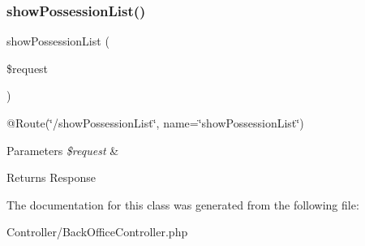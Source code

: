 \subsubsection{\texorpdfstring{showPossessionList()}{showPossessionList()}}
{\footnotesize\ttfamily show\+Possession\+List (\begin{DoxyParamCaption}\item[{}]{\$request }\end{DoxyParamCaption})}

@\+Route(\char`\"{}/show\+Possession\+List\char`\"{}, name=\char`\"{}show\+Possession\+List\char`\"{}) 
\begin{DoxyParams}{Parameters}
{\em \$request} & \\
\hline
\end{DoxyParams}
\begin{DoxyReturn}{Returns}
Response 
\end{DoxyReturn}


The documentation for this class was generated from the following file\+:\begin{DoxyCompactItemize}
\item 
Controller/Back\+Office\+Controller.\+php\end{DoxyCompactItemize}

